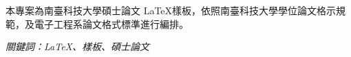 \renewcommand{\abstractname}{摘\hspace{2em}要}
\clearpage
{}
\begin{cntabstract}

\n 本專案為南臺科技大學碩士論文 \LaTeX 樣板，依照南臺科技大學學位論文格示規範，及電子工程系論文格式標準進行編排。

\hbox{}
\it{關鍵詞：\LaTeX、樣板、碩士論文}
\end{cntabstract}
